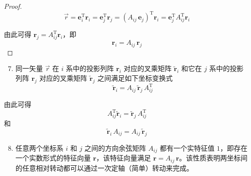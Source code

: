 \begin{proof}
\begin{equation*}
\vec{r} = \boldsymbol{e}_i^{\mathrm{T}} \boldsymbol{r}_i = \boldsymbol{e}_j^{\mathrm{T}} \boldsymbol{r}_j = (A_{ij}\, \boldsymbol{e}_j)^{\mathrm{T}} \boldsymbol{r}_i = \boldsymbol{e}_j^{\mathrm{T}} A_{ij}^{\mathrm{T}} \boldsymbol{r}_i
\end{equation*}

由此可得 $\boldsymbol{r}_j = A_{ij}^{\mathrm{T}} \boldsymbol{r}_i$，即
\begin{equation*}
\boldsymbol{r}_i = A_{ij}\, \boldsymbol{r}_j
\end{equation*}
\end{proof}

\begin{enumerate}\setcounter{enumi}{6}
\item 同一矢量 $\vec{r}$ 在 $i$ 系中的投影列阵 $\boldsymbol{r}_i$ 对应的叉乘矩阵 $\tilde{\boldsymbol{r}}_i$ 和它在 $j$ 系中的投影列阵 $\boldsymbol{r}_j$ 对应的叉乘矩阵 $\tilde{\boldsymbol{r}}_j$ 之间满足如下坐标变换式
\begin{equation}\label{eq:5.skew_transform}
\tilde{\boldsymbol{r}}_i = A_{ij}\, \tilde{\boldsymbol{r}}_j\, A_{ij}^{\mathrm{T}}
\end{equation}
\end{enumerate}

由此可得
\begin{equation}
A_{ij}^{\mathrm{T}} \tilde{\boldsymbol{r}}_i = \tilde{\boldsymbol{r}}_j\, A_{ij}^{\mathrm{T}}
\end{equation}
和
\begin{equation}
\tilde{\boldsymbol{r}}_i\, A_{ij} = A_{ij}\, \tilde{\boldsymbol{r}}_j
\end{equation}

\begin{enumerate}\setcounter{enumi}{7}
\item 任意两个坐标系 $i$ 和 $j$ 之间的方向余弦矩阵 $A_{ij}$ 都有一个实特征值 $1$，即存在一个实数形式的特征向量 $\boldsymbol{r}$，该特征向量满足 $\boldsymbol{r} = A_{ij}\, \boldsymbol{r}$。该性质表明两坐标间的任意相对转动都可以通过一次定轴（简单）转动来完成。
\end{enumerate}


